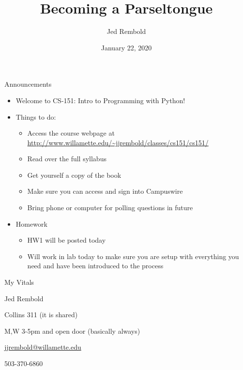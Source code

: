 \documentclass[pdf, aspectratio=169, 12pt]{beamer}
\title{Becoming a Parseltongue}
\author{Jed Rembold}
\date{January 22, 2020}
\begin{document}

\begin{frame}{Announcements}
	\begin{itemize}
		\item Welcome to CS-151: Intro to Programming with Python!
		\item Things to do:
			\begin{itemize}
				\item Access the course webpage at \url{http://www.willamette.edu/~jjrembold/classes/cs151/cs151/}
				\item Read over the full syllabus
				\item Get yourself a copy of the book
				\item Make sure you can access and sign into Campuswire
				\item Bring phone or computer for polling questions in future
			\end{itemize}
		\item Homework
			\begin{itemize}
				\item HW1 will be posted today
				\item Will work in lab today to make sure you are setup with everything you need and have been introduced to the process
			\end{itemize}
	\end{itemize}
\end{frame}

\begin{frame}{My Vitals}
	\begin{description}[align=right, leftmargin=*]
		\item[Name:] Jed Rembold
		\item[Office:] \alert{Collins} 311 (it is shared)
		\item[Office Hours:] M,W 3-5pm and open door (basically always)
		\item[Email:] \url{jjrembold@willamette.edu}
		\item[Office Phone:] 503-370-6860
	\end{description}
\end{frame}
\end{document}
